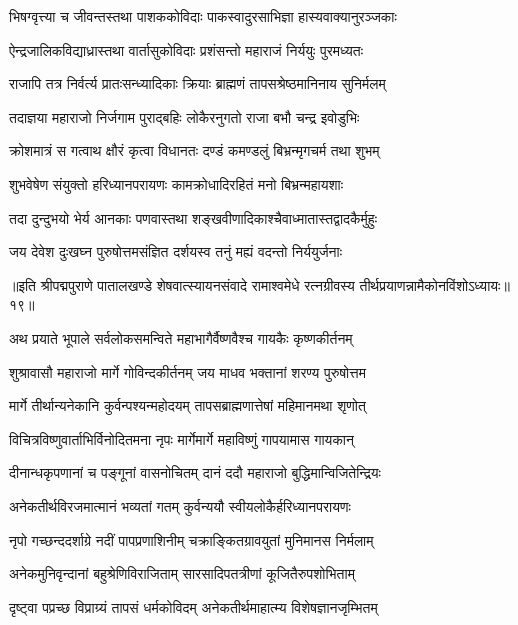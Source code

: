 \twolineshloka
{भिषग्वृत्त्या च जीवन्तस्तथा पाशककोविदाः}
{पाकस्वादुरसाभिज्ञा हास्यवाक्यानुरञ्जकाः}%

\twolineshloka
{ऐन्द्रजालिकविद्याध्रास्तथा वार्तासुकोविदाः}
{प्रशंसन्तो महाराजं निर्ययुः पुरमध्यतः}%

\twolineshloka
{राजापि तत्र निर्वर्त्य प्रातःसन्ध्यादिकाः क्रियाः}
{ब्राह्मणं तापसश्रेष्ठमानिनाय सुनिर्मलम्}%

\twolineshloka
{तदाज्ञया महाराजो निर्जगाम पुराद्बहिः}
{लोकैरनुगतो राजा बभौ चन्द्र इवोडुभिः}%

\twolineshloka
{क्रोशमात्रं स गत्वाथ क्षौरं कृत्वा विधानतः}
{दण्डं कमण्डलुं बिभ्रन्मृगचर्म तथा शुभम्}%

\twolineshloka
{शुभवेषेण संयुक्तो हरिध्यानपरायणः}
{कामक्रोधादिरहितं मनो बिभ्रन्महायशाः}%

\twolineshloka
{तदा दुन्दुभयो भेर्य आनकाः पणवास्तथा}
{शङ्खवीणादिकाश्चैवाध्मातास्तद्वादकैर्मुहुः}%

\twolineshloka
{जय देवेश दुःखघ्न पुरुषोत्तमसंज्ञित}
{दर्शयस्व तनुं मह्यं वदन्तो निर्ययुर्जनाः}%

{॥इति श्रीपद्मपुराणे पातालखण्डे शेषवात्स्यायनसंवादे रामाश्वमेधे रत्नग्रीवस्य तीर्थप्रयाणन्नामैकोनविंशोऽध्यायः॥१९॥}



\twolineshloka
{अथ प्रयाते भूपाले सर्वलोकसमन्विते}
{महाभागैर्वैष्णवैश्च गायकैः कृष्णकीर्तनम्}%

\twolineshloka
{शुश्रावासौ महाराजो मार्गे गोविन्दकीर्तनम्}
{जय माधव भक्तानां शरण्य पुरुषोत्तम}%

\twolineshloka
{मार्गे तीर्थान्यनेकानि कुर्वन्पश्यन्महोदयम्}
{तापसब्राह्मणात्तेषां महिमानमथा शृणोत्}%

\twolineshloka
{विचित्रविष्णुवार्ताभिर्विनोदितमना नृपः}
{मार्गेमार्गे महाविष्णुं गापयामास गायकान्}%

\twolineshloka
{दीनान्धकृपणानां च पङ्गूनां वासनोचितम्}
{दानं ददौ महाराजो बुद्धिमान्विजितेन्द्रियः}%

\twolineshloka
{अनेकतीर्थविरजमात्मानं भव्यतां गतम्}
{कुर्वन्ययौ स्वीयलोकैर्हरिध्यानपरायणः}%

\twolineshloka
{नृपो गच्छन्ददर्शाग्रे नदीं पापप्रणाशिनीम्}
{चक्राङ्कितग्रावयुतां मुनिमानस निर्मलाम्}%

\twolineshloka
{अनेकमुनिवृन्दानां बहुश्रेणिविराजिताम्}
{सारसादिपतत्रीणां कूजितैरुपशोभिताम्}%

\twolineshloka
{दृष्ट्वा पप्रच्छ विप्राग्र्यं तापसं धर्मकोविदम्}
{अनेकतीर्थमाहात्म्य विशेषज्ञानजृम्भितम्}%

